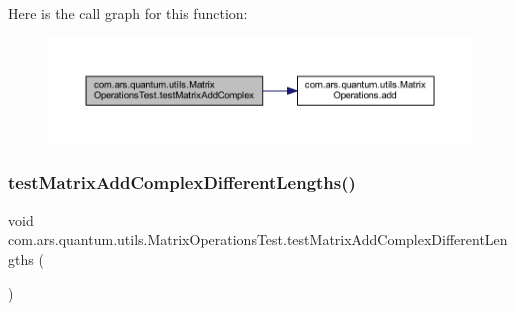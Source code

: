 Here is the call graph for this function\+:\nopagebreak
\begin{figure}[H]
\begin{center}
\leavevmode
\includegraphics[width=350pt]{classcom_1_1ars_1_1quantum_1_1utils_1_1_matrix_operations_test_aad67e722c86ac9893a746e586e76e6c6_cgraph}
\end{center}
\end{figure}
\hypertarget{classcom_1_1ars_1_1quantum_1_1utils_1_1_matrix_operations_test_a6a11674dd3048492205cfcbd810650a4}{}\label{classcom_1_1ars_1_1quantum_1_1utils_1_1_matrix_operations_test_a6a11674dd3048492205cfcbd810650a4} 
\subsubsection{\texorpdfstring{test\+Matrix\+Add\+Complex\+Different\+Lengths()}{testMatrixAddComplexDifferentLengths()}}
{\footnotesize\ttfamily void com.\+ars.\+quantum.\+utils.\+Matrix\+Operations\+Test.\+test\+Matrix\+Add\+Complex\+Different\+Lengths (\begin{DoxyParamCaption}{ }\end{DoxyParamCaption})}

